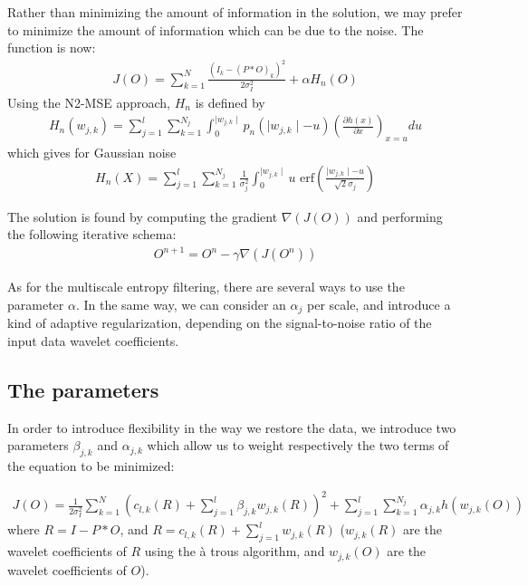 Rather than minimizing the amount of information in the solution, we may
prefer to minimize the amount of information which can be due to the noise.
The function is now:
\begin{eqnarray}
J(O)= \sum_{k=1}^N
 \frac{(I_k-(P*O)_k)^2}{2\sigma_I^2} + \alpha H_n(O)
\end{eqnarray}
Using the N2-MSE approach, $H_n$ is defined by  
\begin{eqnarray}
H_n(w_{j,k}) =  \sum_{j=1}^{l} \sum_{k=1}^{N_j}  \int_{0}^{\mid w_{j,k} \mid }
 p_n(\mid w_{j,k} \mid - u) ( \frac{\partial h(x)}{\partial x} )_{x=u} du
\end{eqnarray}
which gives for Gaussian noise
\begin{eqnarray}
H_n(X) = \sum_{j=1}^{l} \sum_{k=1}^{N_j} \frac{1}{\sigma_j^2} \int_{0}^{\mid w_{j,k} \mid} u 
         \mbox{ erf}(\frac{\mid w_{j,k} \mid -u}{\sqrt{2} \sigma_j})
\end{eqnarray}

The solution is found by computing the gradient $\nabla(J(O))$ 
and performing the following iterative schema:
\begin{eqnarray}
O^{n+1} = O^{n} - \gamma \nabla(J(O^n))
\label{eq_iter1}
\end{eqnarray}

As for the multiscale entropy filtering, there are several ways to use
the parameter $\alpha$. In the same way,
 we can consider an $\alpha_j$ per scale, and introduce a 
kind of adaptive regularization, depending on the signal-to-noise ratio
 of the input data wavelet coefficients.
 
\subsection{The parameters}
\label{sect_mse_param}
In order to introduce flexibility in the way we restore the 
data, we introduce two parameters $\beta_{j,k}$ and $\alpha_{j,k}$ which
allow us to weight respectively the two terms of the equation to 
be minimized:
 
\begin{eqnarray*}
J(O) = \frac{1}{2\sigma_I^2} \sum_{k=1}^N (c_{l,k}(R)
        + \sum_{j=1}^{l} \beta_{j,k} w_{j,k}(R) )^2
        +  \sum_{j=1}^{l} \sum_{k=1}^{N_j} \alpha_{j,k} h(w_{j,k}(O))
\end{eqnarray*}
where $R = I - P * O$, and $R = c_{l,k}(R) + \sum_{j=1}^{l} w_{j,k}(R)$ 
($w_{j,k}(R)$ are the wavelet coefficients of $R$ using the \`a trous 
algorithm, and $w_{j,k}(O)$ are the wavelet coefficients of $O$).

